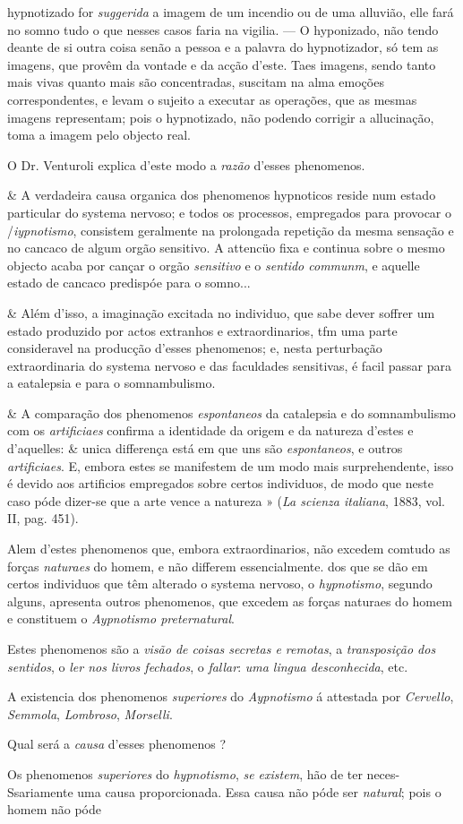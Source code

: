 hypnotizado for \emph{suggerida} a imagem de um incendio ou de uma alluvião, elle fará no somno tudo o que nesses casos faria na vigilia. --- O hyponizado, não tendo deante de si outra coisa senão a pessoa e a palavra do hypnotizador, só tem as imagens, que provêm da vontade e da acção d'este. Taes imagens, sendo tanto mais vivas quanto mais são concentradas, suscitam na alma emoções correspondentes, e levam o sujeito a executar as operações, que as mesmas imagens representam; pois o hypnotizado, não podendo corrigir a allucinação, toma a imagem pelo objecto real.\par O Dr. Venturoli explica d'este modo a \emph{razão} d'esses phenomenos.\par \& A verdadeira causa organica dos phenomenos hypnoticos reside num estado particular do systema nervoso; e todos os processos, empregados para provocar o /\emph{iypnotismo}, consistem geralmente na prolongada repetição da mesma sensação e no cancaco de algum orgão sensitivo. A attencüo fixa e continua sobre o mesmo objecto acaba por cançar o orgão \emph{sensitivo} e o \emph{sentido communm}, e aquelle estado de cancaco predispóe para o somno...\par \& Além d'isso, a imaginação excitada no individuo, que sabe dever soffrer um estado produzido por actos extranhos e extraordinarios, tfm uma parte consideravel na producção d'esses phenomenos; e, nesta perturbação extraordinaria do systema nervoso e das faculdades sensitivas, é facil passar para a eatalepsia e para o somnambulismo.\par \& A comparação dos phenomenos \emph{espontaneos} da catalepsia e do somnambulismo com os \emph{artificiaes} confirma a identidade da origem e da natureza d'estes e d'aquelles: \& unica differença está em que uns são \emph{espontaneos}, e outros \emph{artificiaes}. E, embora estes se manifestem de um modo mais surprehendente, isso é devido aos artificios empregados sobre certos individuos, de modo que neste caso póde dizer-se que a arte vence a natureza » (\emph{La scienza italiana}, 1883, vol. II, pag. 451).\par Alem d'estes phenomenos que, embora extraordinarios, não excedem comtudo as forças \emph{naturaes} do homem, e não differem essencialmente. dos que se dão em certos individuos que têm alterado o systema nervoso, o \emph{hypnotismo}, segundo alguns, apresenta outros phenomenos, que excedem as forças naturaes do homem e constituem o \emph{Aypnotismo preternatural}.\par Estes phenomenos são a \emph{visão de coisas secretas e remotas}, a \emph{transposição dos sentidos}, o \emph{ler nos livros fechados}, o \emph{fallar}: \emph{uma lingua desconhecida}, etc.\par A existencia dos phenomenos \emph{superiores} do \emph{Aypnotismo} á attestada por \emph{Cervello}, \emph{Semmola}, \emph{Lombroso}, \emph{Morselli}.\par Qual será a \emph{causa} d'esses phenomenos ?\par Os phenomenos \emph{superiores} do \emph{hypnotismo}, \emph{se existem}, hão de ter neces- Ssariamente uma causa proporcionada. Essa causa não póde ser \emph{natural}; pois o homem não póde 
